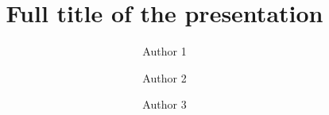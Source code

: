 \documentclass[aspectratio=43]{beamer}		%
\title[Short title]{Full title of the presentation}
\author[Short authors]{Author 1 \and Author 2 \and Author 3}
\begin{document}
  \frame{\titlepage}
  
%  
\end{document}
